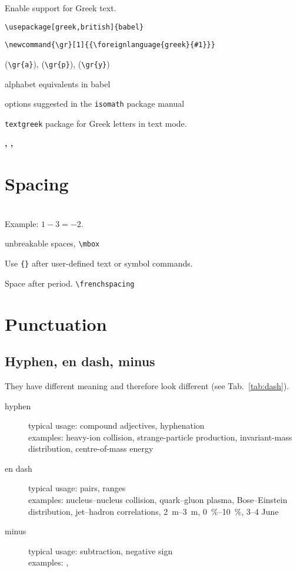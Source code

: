 \documentclass[12pt,a4paper]{article}
\begin{document}
Enable support for Greek text.

\verb!\usepackage[greek,british]{babel}!

\verb!\newcommand{\gr}[1]{{\foreignlanguage{greek}{#1}}}!

 (\verb!\gr{a}!),  (\verb!\gr{p}!),  (\verb!\gr{y}!)

alphabet equivalents in babel

options suggested in the \texttt{isomath} package manual

\texttt{textgreek} package for Greek letters in text mode.

\textbf{\textalpha, \textpi, \textphi}

\section{Spacing}
\label{sec:spacing}

~\cite{iso-80000-1}\\
Example: $1-3=-2$.

unbreakable spaces, \verb_\mbox_

Use \verb_{}_ after user-defined text or symbol commands.

Space after period.
\verb_\frenchspacing_

\section{Punctuation}

\subsection{Hyphen, en dash, minus}

They have different meaning and therefore look different (see Tab.~\ref{tab:dash}).

\begin{description}
\item [hyphen] typical usage: compound adjectives, hyphenation\\
examples: heavy-ion collision, strange-particle production, invariant-mass distribution, centre-of-mass energy
\item [en dash] typical usage: pairs, ranges\\
examples: nucleus--nucleus collision, quark--gluon plasma, Bose--Einstein distribution, jet--hadron correlations, \SIrange{2}{3}{\metre}, \SIrange{0}{10}{\percent}, 3--4 June
\item [minus] typical usage: subtraction, negative sign\\
examples: , 
\end{description}
\end{document}
